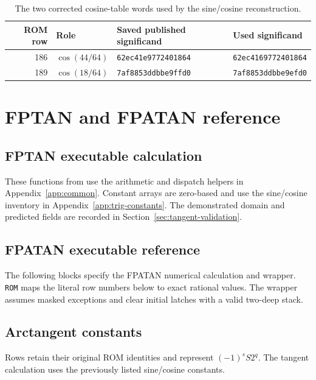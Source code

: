 \documentclass[11pt]{article}
\newcommand{\ins}[1]{\texttt{#1}}
\newcommand{\hex}[1]{\texttt{#1}}
\begin{document}
\begin{table}[ht]
\centering\footnotesize
\begin{tabular}{@{}rlll@{}}
\toprule
ROM row & Role & Saved published significand & Used significand\\
\midrule
186 & $\cos(44/64)$ & \hex{62ec41e9772401864} & \hex{62ec4169772401864}\\
189 & $\cos(18/64)$ & \hex{7af8853ddbbe9ffd0} & \hex{7af8853ddbbe9efd0}\\
\bottomrule
\end{tabular}
\caption{The two corrected cosine-table words used by the sine/cosine reconstruction.}
\end{table}



\clearpage
\section{FPTAN and FPATAN reference}
\label{app:tangent}

\subsection{FPTAN executable calculation}
These functions from  use the arithmetic and
dispatch helpers in Appendix~\ref{app:common}. Constant arrays are
zero-based and use the sine/cosine inventory in
Appendix~\ref{app:trig-constants}. The demonstrated domain and predicted
fields are recorded in Section~\ref{sec:tangent-validation}.


\subsection{FPATAN executable reference}
\label{app:atan}
The following blocks specify the FPATAN numerical calculation and wrapper. \ins{ROM} maps the literal row numbers below to exact rational
values. The wrapper assumes masked exceptions and clear initial latches
with a valid two-deep stack.


\subsection{Arctangent constants}
\label{app:atan-constants}
Rows retain their original ROM identities and represent $(-1)^s S2^q$.
The tangent calculation uses the previously listed sine/cosine constants.

\end{document}
